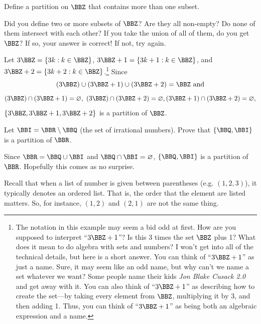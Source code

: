\begin{exer}
Define a partition on $\BBZ$ that contains more than one subset.

\noindent
\answerlinethree
\begin{answer}
Did you define two or more subsets of $\BBZ$? 
Are they all non-empty?
Do none of them intersect with each other?
If you take the union of all of them, do you get $\BBZ$?  
If so, your answer is correct!  If not, try again.
\end{answer}
\end{exer}

\begin{exa}\label{exa:mod3partition}
Let $3\BBZ =\{3k:k\in \BBZ\}$, 
$3\BBZ +1=\{3k+1:k\in \BBZ\}$, and 
$3\BBZ +2=\{3k+2:k\in \BBZ\}$.\footnote{The notation in this example may seem a bid odd at first.
How are you supposed to interpret ``$3\BBZ +1$''?  Is this 3 times the set $\BBZ$ plus 1?
What does it mean to do algebra with sets and numbers? 
I won't get into all of the technical details, but here is a short answer.
You can think of ``$3\BBZ +1$'' as just a name.  
Sure, it may seem like an odd name, but why can't we name a set whatever we want?
Some people name their kids {\em Jon Blake Cusack 2.0} and get away with it.
You can also think of ``$3\BBZ +1$'' as describing how to create the set---by taking
every element from $\BBZ$, multiplying it by 3, and then adding 1.
Thus, you can think of  ``$3\BBZ +1$'' as being both an algebraic expression and a name.
}   
Since 
$$(3\BBZ)\cup (3\BBZ + 1) \cup (3\BBZ + 2) = \BBZ \mbox{ and}$$ 
$$ (3\BBZ)\cap (3\BBZ + 1) = \varnothing, \ (3\BBZ)\cap (3\BBZ + 2) = \varnothing,
(3\BBZ + 1)\cap (3\BBZ + 2) = \varnothing,$$ 
  $\{3\BBZ, 3\BBZ
+ 1, 3\BBZ + 2\}$ is a partition of $\BBZ$. \label{ex:mod3}
\end{exa}

\begin{exer}
Let $\BBI=\BBR \setminus \BBQ$ (the set of irrational numbers).
Prove that $\{\BBQ,\BBI\}$ is a partition of $\BBR$.

\noindent
\pflinethree
\begin{answer}
Since $\BBR = \BBQ \cup \BBI$ and $\BBQ \cap \BBI = \varnothing$, $\{\BBQ,\BBI\}$ is a partition of $\BBR$.
Hopefully this comes as no surprise.   
\end{answer}  
\end{exer}

Recall that when a list of number is given between parentheses (e.g. $(1,2,3)$), it typically denotes
an ordered list.  That is, the order that the element are listed matters.  So, for instance, $(1,2)$ 
and $(2,1)$ are not the same thing.

